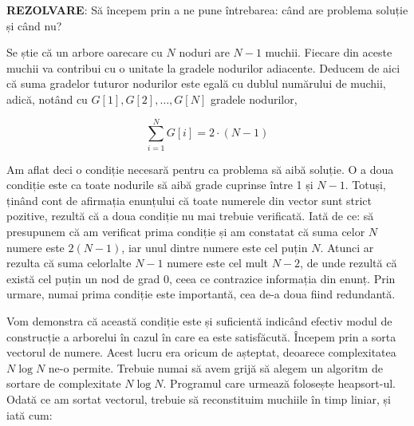 {\bf REZOLVARE}: Să începem prin a ne pune întrebarea: când are problema
soluție și când nu?

Se știe că un arbore oarecare cu $N$ noduri are $N-1$ muchii. Fiecare din
aceste muchii va contribui cu o unitate la gradele nodurilor
adiacente. Deducem de aici că suma gradelor tuturor nodurilor este egală cu
dublul numărului de muchii, adică, notând cu $G[1], G[2], \dots, G[N]$ gradele
nodurilor,

\begin{equation}
  \sum_{i = 1}^{N} G[i] = 2 \cdot (N - 1)
\end{equation}

Am aflat deci o condiție necesară pentru ca problema să aibă soluție. O a doua
condiție este ca toate nodurile să aibă grade cuprinse între 1 și
$N-1$. Totuși, ținând cont de afirmația enunțului că toate numerele din vector
sunt strict pozitive, rezultă că a doua condiție nu mai trebuie
verificată. Iată de ce: să presupunem că am verificat prima condiție și am
constatat că suma celor $N$ numere este $2(N-1)$, iar unul dintre numere este
cel puțin $N$. Atunci ar rezulta că suma celorlalte $N-1$ numere este cel mult
$N-2$, de unde rezultă că există cel puțin un nod de grad 0, ceea ce
contrazice informația din enunț. Prin urmare, numai prima condiție este
importantă, cea de-a doua fiind redundantă.

Vom demonstra că această condiție este și suficientă indicând efectiv modul de
construcție a arborelui în cazul în care ea este satisfăcută. Începem prin a
sorta vectorul de numere. Acest lucru era oricum de așteptat, deoarece
complexitatea $N \log N$ ne-o permite. Trebuie numai să avem grijă să alegem
un algoritm de sortare de complexitate $N \log N$. Programul care urmează
folosește heapsort-ul. Odată ce am sortat vectorul, trebuie să reconstituim
muchiile în timp liniar, și iată cum:

